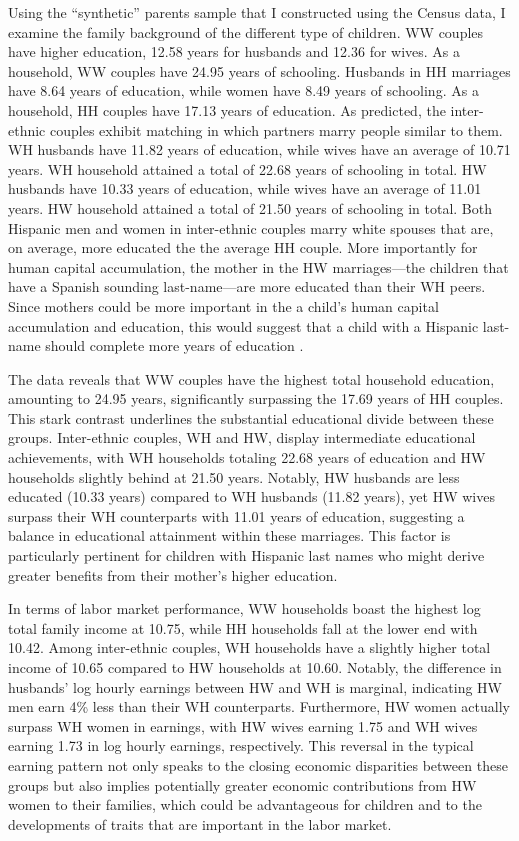 Using the ``synthetic'' parents sample that I constructed using the Census data, I examine the family background of the different type of children. WW couples have higher education, 12.58 years for husbands and 12.36 for wives. As a household, WW couples have 24.95 years of schooling. Husbands in HH marriages have 8.64 years of education, while women have 8.49 years of schooling. As a household, HH couples have 17.13 years of education. As predicted, the inter-ethnic couples exhibit matching in which partners marry people similar to them. WH husbands have 11.82 years of education, while wives have an average of 10.71 years. WH household attained a total of 22.68 years of schooling in total. HW husbands have 10.33 years of education, while wives have an average of 11.01 years. HW household attained a total of 21.50 years of schooling in total. Both Hispanic men and women in inter-ethnic couples marry white spouses that are, on average, more educated the the average HH couple. More importantly for human capital accumulation, the mother in the HW marriages---the children that have a Spanish sounding last-name---are more educated than their WH peers. Since mothers could be more important in the a child's human capital accumulation and education, this would suggest that a child with a Hispanic last-name should complete more years of education \autocite{gould2020does}.

The data reveals that WW couples have the highest total household education, amounting to 24.95 years, significantly surpassing the 17.69 years of HH couples. This stark contrast underlines the substantial educational divide between these groups. Inter-ethnic couples, WH and HW, display intermediate educational achievements, with WH households totaling 22.68 years of education and HW households slightly behind at 21.50 years. Notably, HW husbands are less educated (10.33 years) compared to WH husbands (11.82 years), yet HW wives surpass their WH counterparts with 11.01 years of education, suggesting a balance in educational attainment within these marriages. This factor is particularly pertinent for children with Hispanic last names who might derive greater benefits from their mother's higher education.

In terms of labor market performance, WW households boast the highest log total family income at 10.75, while HH households fall at the lower end with 10.42. Among inter-ethnic couples, WH households have a slightly higher total income of 10.65 compared to HW households at 10.60. Notably, the difference in husbands' log hourly earnings between HW and WH is marginal, indicating HW men earn 4\% less than their WH counterparts. Furthermore, HW women actually surpass WH women in earnings, with HW wives earning 1.75 and WH wives earning 1.73 in log hourly earnings, respectively. This reversal in the typical earning pattern not only speaks to the closing economic disparities between these groups but also implies potentially greater economic contributions from HW women to their families, which could be advantageous for children and to the developments of traits that are important in the labor market.

